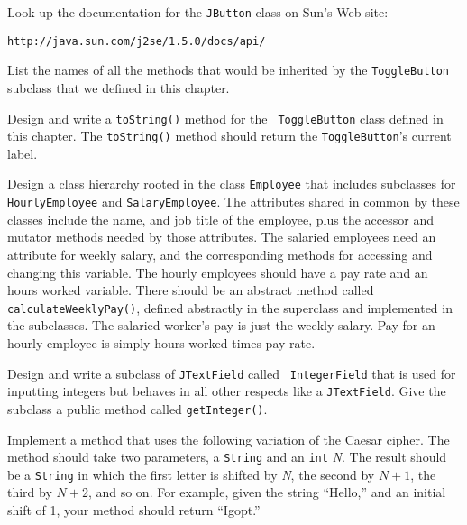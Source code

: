 \begin{EXRtwo}
\item  Look up the documentation for the {\tt JButton} class
on Sun's Web site:

\begin{jjjlisting}
\begin{lstlisting}[commentstyle=\color{black}]
http://java.sun.com/j2se/1.5.0/docs/api/
\end{lstlisting}
\end{jjjlisting}

\noindent List the names of all the methods that would be inherited by
the {\tt ToggleButton} subclass that we defined in this chapter.

\item Design and write a {\tt toString()} method for the {\tt
ToggleButton} class defined in this chapter. The {\tt toString()}
method should return the {\tt ToggleButton}'s current label.

\item Design a class hierarchy rooted in the class {\tt Employee} that
includes subclasses for {\tt HourlyEmployee} and {\tt SalaryEmployee}.
The attributes shared in common by these classes include the name, and
job title of the employee, plus the accessor and mutator methods
needed by those attributes.  The salaried employees need an attribute
for weekly salary, and the corresponding methods for accessing and
changing this variable.  The hourly employees should have a pay rate
and an hours worked variable.  There should be an abstract method
called {\tt calculateWeeklyPay()}, defined abstractly in the
superclass and implemented in the subclasses. The salaried worker's
pay is just the weekly salary. Pay for an hourly employee is simply
hours worked times pay rate.

\item Design and write a subclass of {\tt JTextField} called {\tt
Integer\-Field} that is used for inputting integers but behaves in all
other respects like a {\tt JTextField}.  Give the subclass a public
method called {\tt getInteger()}.

\item Implement a method that uses the following variation of the
Caesar cipher.  The method should take two parameters, a {\tt String}
and an {\tt int} {\it N}. The result should be a {\tt String} in which
the first letter is shifted by {\it N}, the second by $N+1$, the third
by $N+2$, and so on.  For example, given the string ``Hello,'' and an
initial shift of 1, your method should return ``Igopt.''


\end{EXRtwo}
